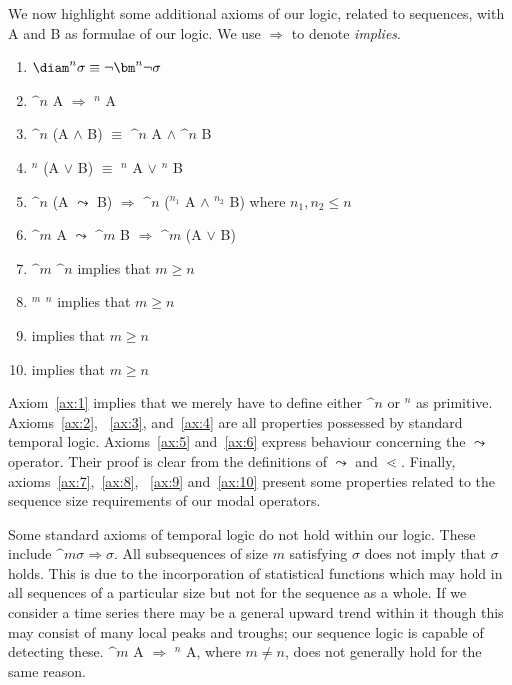 We now highlight some additional axioms of our logic, related to
sequences, with A and B as formulae of our logic. We use $\Rightarrow$
to denote {\em implies}.

\begin{enumerate}
\item\label{ax:1} $\mbox{\diam}^n \sigma \equiv \neg \bm^n \neg \sigma$
\item\label{ax:2} $\bm^n$ A $\Rightarrow$ \diam$^n$ A
\item\label{ax:3} $\bm^n$ (A $\wedge$ B) $\equiv$ $\bm^n$ A $\wedge$ $\bm^n$ B
\item\label{ax:4} \diam$^n$ (A $\vee$ B) $\equiv$ \diam$^n$ A $\vee$ \diam$^n$ B
\item\label{ax:5} $\bm^n$ (A $\leadsto$ B) $\Rightarrow$ $\bm^n$
(\diam$^{n_1}$ A $\wedge$ \diam$^{n_2}$ B) where $n_1, n_2 \le n$
\item\label{ax:6}  $\bm^m$ A $\leadsto$ $\bm^m$ B $\Rightarrow$ $\bm^m$ (A $\vee$ B)
\item\label{ax:7} $\bm^m$ $\bm^n$ implies that $m \ge n$
\item\label{ax:8} \diam$^m$ \diam$^n$ implies that $m \ge n$
\item\label{ax:9}  implies that $m \ge n$
\item\label{ax:10}  implies that $m \ge n$
\end{enumerate}

Axiom~\ref{ax:1} implies that we merely have to define either $\bm^n$
or \diam$^n$ as primitive. Axioms~\ref{ax:2}, ~\ref{ax:3},
and~\ref{ax:4} are all properties possessed by standard temporal
logic. Axioms~\ref{ax:5} and~\ref{ax:6} express behaviour concerning
the $\leadsto$ operator. Their proof is clear from the definitions of
$\leadsto$ and $\lessdot$. Finally, axioms~\ref{ax:7},~\ref{ax:8}, ~\ref{ax:9} and~\ref{ax:10}
present some properties related to the sequence size requirements of our modal
operators.  

\medskip

Some standard axioms of temporal logic do not hold within our
logic. These include $\bm^{m} \sigma \Rightarrow \sigma$. All
subsequences of size $m$ satisfying $\sigma$ does not imply that
$\sigma$ holds. This is due to the incorporation of statistical
functions which may hold in all sequences of a particular size but not
for the sequence as a whole. If we consider a time series there may be
a general upward trend within it though this may consist of many
local peaks and troughs; our sequence logic is capable of detecting
these. $\bm^m$ A $\Rightarrow$ \diam$^n$ A, where $m \not= n$, does
not generally hold for the same reason.

